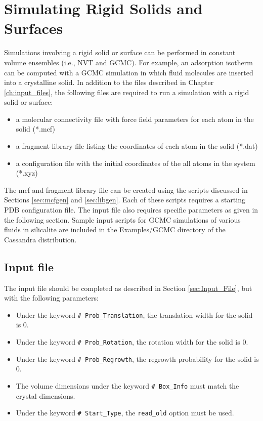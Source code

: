\chapter{Simulating Rigid Solids and Surfaces}

Simulations involving a rigid solid or surface can be performed in constant volume ensembles
(i.e., NVT and GCMC). 
For example, an adsorption isotherm can be computed with a GCMC simulation in which fluid molecules
are inserted into a crystalline solid.
In addition to the files described in Chapter \ref{ch:input_files}, 
the following files are required to run a simulation with a rigid solid or surface:

\begin{itemize}
\item a molecular connectivity file with force field parameters for each atom in the solid (*.mcf)
\item a fragment library file listing the coordinates of each atom in the solid (*.dat)
\item a configuration file with the initial coordinates of the all atoms in the system (*.xyz) 
\end{itemize} 

The mcf and fragment library file can be created using the scripts discussed in Sections \ref{sec:mcfgen} and \ref{sec:libgen}. 
Each of these scripts requires a starting PDB configuration file.
The input file also requires specific parameters as given in the following section. Sample input scripts for GCMC simulations
of various fluids in silicalite are included in the Examples/GCMC directory of the Cassandra distribution.
 
\section{Input file}
The input file should be completed as described in Section \ref{sec:Input_File}, but with the following parameters:

\begin{itemize}
	\item Under the keyword \texttt{\# Prob\_Translation}, the translation width for the solid is 0.
	\item Under the keyword \texttt{\# Prob\_Rotation}, the rotation width for the solid is 0.
	\item Under the keyword \texttt{\# Prob\_Regrowth}, the regrowth probability for the solid is 0.
	\item The volume dimensions under the keyword \texttt{\# Box\_Info} must match the crystal dimensions.
	\item Under the keyword \texttt{\# Start\_Type}, the \texttt{read\_old} option must be used.
\end{itemize}

